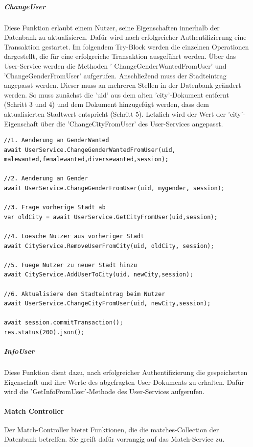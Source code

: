 \noindent
\subparagraph{ChangeUser}
Diese Funktion erlaubt einem Nutzer, seine Eigenschaften innerhalb der Datenbank zu aktualisieren. Dafür wird nach erfolgreicher Authentifizierung eine Transaktion gestartet. Im folgendem Try-Block werden die einzelnen Operationen dargestellt, die für eine erfolgreiche Transaktion ausgeführt werden. Über das User-Service werden die Methoden ' ChangeGenderWantedFromUser' und 'ChangeGenderFromUser' aufgerufen. Anschließend muss der Stadteintrag angepasst werden. 
Dieser muss an mehreren Stellen in der Datenbank geändert werden. 
So muss zunächst die 'uid' aus dem alten 'city'-Dokument entfernt (Schritt 3 und 4) und dem  Dokument hinzugefügt werden, dass dem aktualisierten Stadtwert entspricht (Schritt 5). Letzlich wird der Wert der 'city'-Eigenschaft über die 'ChangeCityFromUser' des User-Services angepasst.

\begin{lstlisting}[caption=UserController - Change User, label=lst:UserControlleruserchange]
//1. Aenderung an GenderWanted
await UserService.ChangeGenderWantedFromUser(uid, malewanted,femalewanted,diversewanted,session);

//2. Aenderung an Gender
await UserService.ChangeGenderFromUser(uid, mygender, session);

//3. Frage vorherige Stadt ab
var oldCity = await UserService.GetCityFromUser(uid,session);

//4. Loesche Nutzer aus vorheriger Stadt
await CityService.RemoveUserFromCity(uid, oldCity, session);

//5. Fuege Nutzer zu neuer Stadt hinzu
await CityService.AddUserToCity(uid, newCity,session);

//6. Aktualisiere den Stadteintrag beim Nutzer
await UserService.ChangeCityFromUser(uid, newCity,session);

await session.commitTransaction();
res.status(200).json();
\end{lstlisting}
  
\noindent
\subparagraph{InfoUser}     
Diese Funktion dient dazu, nach erfolgreicher Authentifizierung die gespeicherten Eigenschaft und ihre Werte des abgefragten User-Dokuments zu erhalten. Dafür wird die 'GetInfoFromUser'-Methode des User-Services aufgerufen.
        

%
%


\paragraph{Match Controller}
Der Match-Controller bietet Funktionen, die die matches-Collection der Datenbank betreffen. Sie greift dafür vorrangig auf das Match-Service zu.

